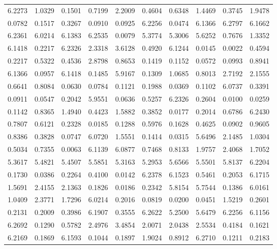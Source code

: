 \begin{table}[h]
\centering
\begin{tabular}{c c c c c c c c c c }
\hline
6.2273 & 1.0329 & 0.1501 & 0.7199 & 2.2009 & 0.4604 & 0.6348 & 1.4469 & 0.3745 & 1.9478 \\
0.0782 & 0.1517 & 0.3267 & 0.0910 & 0.0925 & 6.2256 & 0.0474 & 6.1366 & 6.2797 & 6.1662 \\
6.2361 & 6.0214 & 6.1383 & 6.2535 & 0.0079 & 5.3774 & 5.3006 & 5.6252 & 0.7676 & 1.3352 \\
6.1418 & 0.2217 & 6.2326 & 2.3318 & 3.6128 & 0.4920 & 6.1244 & 0.0145 & 0.0022 & 0.4594 \\
0.2217 & 0.5322 & 0.4536 & 2.8798 & 0.8653 & 0.1419 & 0.1152 & 0.0572 & 0.0993 & 0.8941 \\
6.1366 & 0.0957 & 6.1418 & 0.1485 & 5.9167 & 0.1309 & 1.0685 & 0.8013 & 2.7192 & 2.1555 \\
0.6641 & 0.8084 & 0.0630 & 0.0784 & 0.1121 & 0.1988 & 0.0369 & 0.1102 & 6.0737 & 0.3391 \\
0.0911 & 0.0547 & 0.2042 & 5.9551 & 0.0636 & 0.5257 & 6.2326 & 0.2604 & 0.0100 & 0.0259 \\
0.1142 & 0.8365 & 1.4940 & 0.4423 & 1.5882 & 0.3852 & 0.0177 & 0.2014 & 0.6786 & 6.2430 \\
0.7807 & 0.6121 & 0.2328 & 0.0185 & 0.1288 & 0.5976 & 0.1628 & 0.4625 & 0.0902 & 0.9605 \\
0.8386 & 0.3828 & 0.0747 & 6.0720 & 1.5551 & 0.1414 & 0.0315 & 5.6496 & 2.1485 & 1.0304 \\
0.5034 & 0.7355 & 0.0063 & 6.1139 & 6.0877 & 0.7468 & 0.8133 & 1.9757 & 2.4068 & 1.7052 \\
5.3617 & 5.4821 & 5.4507 & 5.5851 & 5.3163 & 5.2953 & 5.6566 & 5.5501 & 5.8137 & 6.2204 \\
0.1730 & 0.0386 & 0.2264 & 0.4100 & 0.0142 & 6.2378 & 6.1523 & 0.5461 & 0.2053 & 6.1715 \\
1.5691 & 2.4155 & 2.1363 & 0.1826 & 0.0186 & 0.2342 & 5.8154 & 5.7544 & 0.1386 & 6.0161 \\
1.0409 & 2.3771 & 1.7296 & 6.0214 & 0.2016 & 0.0819 & 0.0200 & 0.0451 & 1.5219 & 0.2601 \\
0.2131 & 0.2009 & 0.3986 & 6.1907 & 0.3555 & 6.2622 & 5.2500 & 5.6479 & 6.2256 & 6.1156 \\
6.2692 & 0.1290 & 0.5782 & 2.4976 & 3.4854 & 2.0071 & 2.0438 & 2.5534 & 0.4184 & 0.1621 \\
6.2169 & 0.1869 & 6.1593 & 0.1044 & 0.1897 & 1.9024 & 0.8912 & 6.2710 & 0.1211 & 0.2183 \\

\end{tabular}
\end{table}
